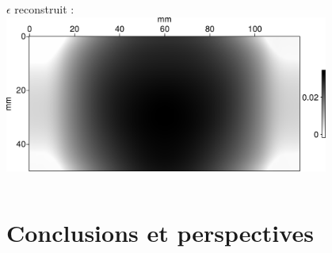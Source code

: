 \documentclass[10pt,xcolor=x11names,compress, notes=show]{beamer}%
\begin{document}
\begin{frame}{\insertsectionhead}
\begin{columns}
		\centering
		$\epsilon$ reconstruit : \\[0.2cm]
		\includegraphics[width=0.8\textwidth]{img/anisotrope/epsilon_final.png}\\
		
		
		
	\end{columns}	
\end{frame}


\section{Conclusions et perspectives}
\end{document}
